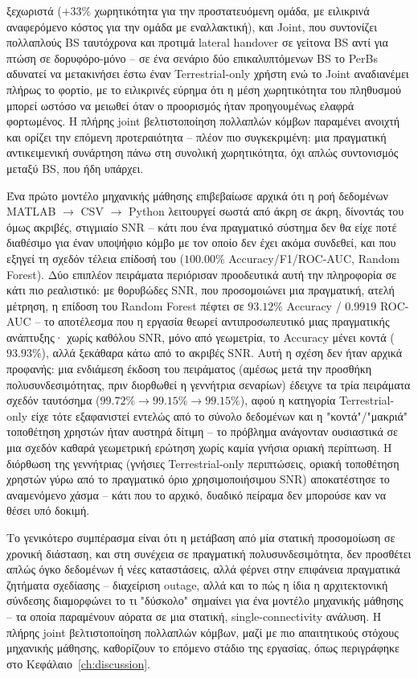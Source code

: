 ξεχωριστά ($+33\%$ χωρητικότητα για την προστατευόμενη ομάδα, με
ειλικρινά αναφερόμενο κόστος για την ομάδα με εναλλακτική), και Joint,
που συντονίζει πολλαπλούς BS ταυτόχρονα και προτιμά lateral handover σε
γείτονα BS αντί για πτώση σε δορυφόρο-μόνο -- σε ένα σενάριο δύο
επικαλυπτόμενων BS το PerBs αδυνατεί να μετακινήσει έστω έναν
Terrestrial-only χρήστη ενώ το Joint αναδιανέμει πλήρως το φορτίο, με
το ειλικρινές εύρημα ότι η μέση χωρητικότητα του πληθυσμού μπορεί ωστόσο
να μειωθεί όταν ο προορισμός ήταν προηγουμένως ελαφρά φορτωμένος. Η
πλήρης joint βελτιστοποίηση πολλαπλών κόμβων παραμένει ανοιχτή και
ορίζει την επόμενη προτεραιότητα -- πλέον πιο συγκεκριμένη: μια
πραγματική αντικειμενική συνάρτηση πάνω στη συνολική χωρητικότητα, όχι
απλώς συντονισμός μεταξύ BS, που ήδη υπάρχει.

Ένα πρώτο μοντέλο μηχανικής μάθησης επιβεβαίωσε αρχικά ότι η ροή
δεδομένων MATLAB $\rightarrow$ CSV $\rightarrow$ Python λειτουργεί σωστά
από άκρη σε άκρη, δίνοντάς του όμως ακριβές, στιγμιαίο SNR -- κάτι που
ένα πραγματικό σύστημα δεν θα είχε ποτέ διαθέσιμο για έναν υποψήφιο κόμβο
με τον οποίο δεν έχει ακόμα συνδεθεί, και που εξηγεί τη σχεδόν τέλεια
επίδοσή του ($100.00\%$ Accuracy/F1/ROC-AUC, Random Forest). Δύο
επιπλέον πειράματα περιόρισαν προοδευτικά αυτή την πληροφορία σε κάτι
πιο ρεαλιστικό: με θορυβώδες SNR, που προσομοιώνει μια πραγματική, ατελή
μέτρηση, η επίδοση του Random Forest πέφτει σε $93.12\%$ Accuracy /
$0.9919$ ROC-AUC -- το αποτέλεσμα που η εργασία θεωρεί αντιπροσωπευτικό
μιας πραγματικής ανάπτυξης· χωρίς καθόλου SNR, μόνο από γεωμετρία, το
Accuracy μένει κοντά ($93.93\%$), αλλά ξεκάθαρα κάτω από το ακριβές SNR.
Αυτή η σχέση δεν ήταν αρχικά προφανής: μια ενδιάμεση έκδοση του
πειράματος (αμέσως μετά την προσθήκη πολυσυνδεσιμότητας, πριν διορθωθεί
η γεννήτρια σεναρίων) έδειχνε τα τρία πειράματα σχεδόν ταυτόσημα
($99.72\%\rightarrow99.15\%\rightarrow99.15\%$), αφού η κατηγορία
Terrestrial-only είχε τότε εξαφανιστεί εντελώς από το σύνολο δεδομένων
και η "κοντά"/"μακριά" τοποθέτηση χρηστών ήταν αυστηρά δίτιμη -- το
πρόβλημα ανάγονταν ουσιαστικά σε μια σχεδόν καθαρά γεωμετρική ερώτηση
χωρίς καμία γνήσια οριακή περίπτωση. Η διόρθωση της γεννήτριας (γνήσιες
Terrestrial-only περιπτώσεις, οριακή τοποθέτηση χρηστών γύρω από το
πραγματικό όριο χρησιμοποιήσιμου SNR) αποκατέστησε το αναμενόμενο χάσμα
-- κάτι που το αρχικό, δυαδικό πείραμα δεν μπορούσε καν να θέσει υπό
δοκιμή.

Το γενικότερο συμπέρασμα είναι ότι η μετάβαση από μία στατική
προσομοίωση σε χρονική διάσταση, και στη συνέχεια σε πραγματική
πολυσυνδεσιμότητα, δεν προσθέτει απλώς όγκο δεδομένων ή νέες καταστάσεις,
αλλά φέρνει στην επιφάνεια πραγματικά ζητήματα σχεδίασης -- διαχείριση
outage, αλλά και το πώς η ίδια η αρχιτεκτονική σύνδεσης διαμορφώνει το τι
"δύσκολο" σημαίνει για ένα μοντέλο μηχανικής μάθησης -- τα οποία
παραμένουν αόρατα σε μια στατική, single-connectivity ανάλυση. Η πλήρης
joint βελτιστοποίηση πολλαπλών κόμβων, μαζί με πιο απαιτητικούς στόχους
μηχανικής μάθησης, καθορίζουν το επόμενο στάδιο της εργασίας, όπως
περιγράφηκε στο Κεφάλαιο~\ref{ch:discussion}.
